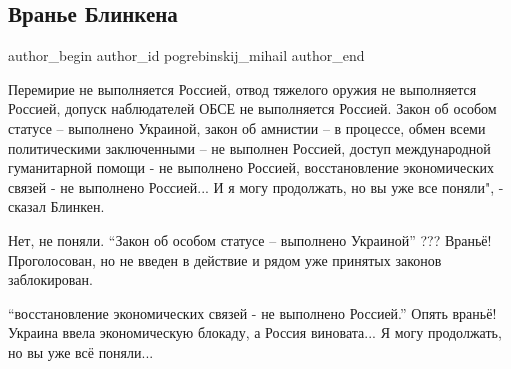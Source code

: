  
 
 
 
 
 
\subsection{Вранье Блинкена}
\label{sec:02_12_2021.fb.pogrebinskij_mihail.1.vranje_blinken}
 
\ifcmt
 author_begin
   author_id pogrebinskij_mihail
 author_end
\fi

Перемирие не выполняется Россией, отвод тяжелого оружия не выполняется Россией,
допуск наблюдателей ОБСЕ не выполняется Россией. Закон об особом статусе –
выполнено Украиной, закон об амнистии – в процессе, обмен всеми политическими
заключенными – не выполнен Россией, доступ международной гуманитарной помощи -
не выполнено Россией, восстановление экономических связей - не выполнено
Россией... И я могу продолжать, но вы уже все поняли", - сказал Блинкен. 

Нет, не поняли. \enquote{Закон об особом статусе – выполнено Украиной} ??? Враньё!
Проголосован, но не введен в действие и рядом уже принятых законов
заблокирован. 

\enquote{восстановление экономических связей - не выполнено Россией.} Опять враньё!
Украина ввела экономическую блокаду, а Россия виновата... Я могу продолжать, но
вы уже всё поняли...


